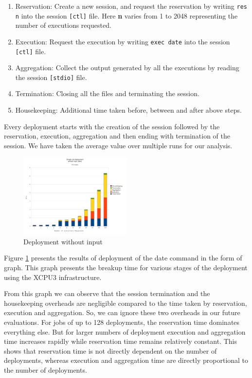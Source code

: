 \documentclass[conference]{IEEEtran}
\begin{document}
\begin{enumerate}
\item Reservation: Create a new session, and request the reservation by writing
\texttt{res n} into the session \texttt{[ctl]} file.  Here \textbf{n} varies
from 1 to 2048 representing the number of executions requested. 

\item Execution: Request the execution by writing \texttt{exec date} into the
session \texttt{[ctl]} file.

\item Aggregation: Collect the output generated by all the executions by reading
the session \texttt{[stdio]} file.

\item Termination: Closing all the files and terminating the session.

\item Housekeeping: Additional time taken before, between and after above steps.
\end{enumerate}
Every deployment starts with the creation of the session followed by the
reservation, execution, aggregation and then ending with termination of the
session.  We have taken the average value over multiple runs for our analysis.

\begin{figure}[h]
  \begin{center}
    \leavevmode
      \includegraphics[height=0.2\textheight,width=0.5\textwidth]
		{./img/date_graph}
    \caption{Deployment without input}
    \label{fig:date_graph}
  \end{center}
\end{figure}

Figure \ref{fig:date_graph} presents the results of deployment of the date
command in the form of graph.  This graph presents the breakup time for various
stages of the deployment using the XCPU3 infrastructure.

From this graph we can observe that the session termination and the housekeeping
overheads are negligible compared to the time taken by reservation, execution
and aggregation.  So, we can ignore these two overheads in our future
evaluations.  For jobs of up to 128 deployments, the reservation time dominates
everything else.  But for larger numbers of deployment execution and
aggregation time increases rapidly while reservation time remains relatively
constant. This shows that reservation time is not directly dependent on
the number of deployments, whereas execution and aggregation time are directly
proportional to the number of deployments.
\end{document}
